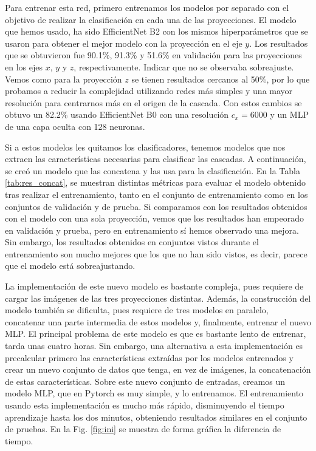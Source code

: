 \documentclass[a4paper,12pt,oneside,titlepage]{book}
\begin{document}
Para entrenar esta red, primero entrenamos los modelos por separado con el objetivo de realizar la clasificación en cada una de las proyecciones. El modelo que hemos usado, ha sido EfficientNet B2 con los mismos hiperparámetros que se usaron para obtener el mejor modelo con la proyección en el eje $y$. Los resultados que se obtuvieron fue 90.1\%, 91.3\% y 51.6\% en validación para las proyecciones en los ejes $x$, $y$ y $z$, respectivamente. Indicar que no se observaba sobreajuste. Vemos como para la proyección $z$ se tienen resultados cercanos al 50\%, por lo que probamos a reducir la complejidad utilizando redes más simples y una mayor resolución para centrarnos más en el origen de la cascada. Con estos cambios se obtuvo un 82.2\% usando EfficientNet B0 con una resolución $c_x = 6000$ y un MLP de una capa oculta con 128 neuronas.
 
Si a estos modelos les quitamos los clasificadores, tenemos modelos que nos extraen las características necesarias para clasificar las cascadas. A continuación, se creó un modelo que las concatena y las usa para la clasificación. En la Tabla \ref{tab:res_concat}, se muestran distintas métricas para evaluar el modelo obtenido tras realizar el entrenamiento, tanto en el conjunto de entrenamiento como en los conjuntos de validación y de prueba. Si comparamos con los resultados obtenidos con el modelo con una sola proyección, vemos que los resultados han empeorado en validación y prueba, pero en entrenamiento sí hemos observado una mejora. Sin embargo, los resultados obtenidos en conjuntos vistos durante el entrenamiento son mucho mejores que los que no han sido vistos, es decir, parece que el modelo está sobreajustando.

La implementación de este nuevo modelo es bastante compleja, pues requiere de cargar las imágenes de las tres proyecciones distintas. Además, la construcción del modelo también se dificulta, pues requiere de tres modelos en paralelo, concatenar una parte intermedia de estos modelos y, finalmente, entrenar el nuevo MLP. El principal problema de este modelo es que es bastante lento de entrenar, tarda unas cuatro horas. Sin embargo, una alternativa a esta implementación es precalcular primero las características extraídas por los modelos entrenados y crear un nuevo conjunto de datos que tenga, en vez de imágenes, la concatenación de estas características. Sobre este nuevo conjunto de entradas, creamos un modelo MLP, que en Pytorch es muy simple, y lo entrenamos. El entrenamiento usando esta implementación es mucho más rápido, disminuyendo el tiempo aprendizaje hasta los dos minutos, obteniendo resultados similares en el conjunto de pruebas. En la Fig. \ref{fig:ini} se muestra de forma gráfica la diferencia de tiempo.
\end{document}
